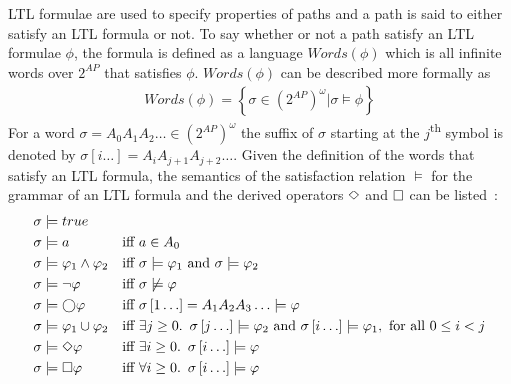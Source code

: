 LTL formulae are used to specify properties of paths and a path is said to either satisfy an LTL formula or not.  To say whether or not a path satisfy an LTL formulae $\phi$, the formula is defined as a language $Words(\phi)$ which is all infinite words over $2^{AP}$ that satisfies $\phi$. $Words(\phi)$ can be described more formally as~\cite[p.~235, def. 5.6]{baier2008principles}
\begin{align*}
    Words(\phi) = \left\{ \sigma \in \left( 2^{AP} \right)^\omega | \sigma \models \phi \right\}
\end{align*}
For a word $\sigma = A_0 A_1 A_2 \ldots \in \left( 2^{AP} \right)^\omega$ the suffix of $\sigma$ starting at the $j$\textsuperscript{th} symbol is denoted by $\sigma \left[ i \ldots \right] = A_i A_{j+1} A_{j+2} \ldots$. Given the definition of the words that satisfy an LTL formula, the semantics of the satisfaction relation $\models$ for the grammar of an LTL formula and the derived operators $\Diamond$ and $\square$ can be listed~\cite{baier2008principles}:
\begin{align}
    \sigma &\models true                && \label{eq:sem-true}\\
    \sigma &\models a                   &\text{iff }& a \in A_0 \\
    \sigma &\models \varphi_1 \land \varphi_2 &\text{iff }& \sigma \models \varphi_1 \text{ and } \sigma \models \varphi_2 \\
    \sigma &\models \lnot \varphi          &\text{iff }& \sigma \not\models \varphi\\
    \sigma &\models \bigcirc \varphi             &\text{iff }& \sigma\left[1\ldots\right] = A_1 A_2 A_3\ldots \models \varphi\\
    \sigma &\models \varphi_1 \cup \varphi_2    &\text{iff }& \exists j \geq 0.\enskip \sigma\left[j\ldots\right] \models \varphi_2 \text{ and } \sigma\left[i\ldots\right] \models \varphi_1, \text{ for all } 0 \leq i < j \\
    \sigma &\models \Diamond \varphi             &\text{iff }& \exists i \geq 0.\enskip \sigma\left[i\ldots\right] \models \varphi \\
    \sigma &\models \square \varphi             &\text{iff }& \forall i \geq 0.\enskip \sigma\left[i\ldots\right] \models \varphi \label{eq:sem-always}
\end{align}

